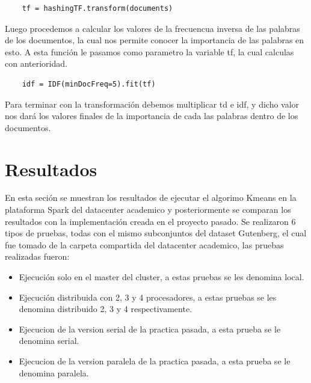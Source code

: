 \documentclass[conference,compsoc]{IEEEtran}
\begin{document}
\begin{lstlisting}
    tf = hashingTF.transform(documents)
\end{lstlisting}

\vspace{0.5cm}

Luego procedemos a calcular los valores de la frecuencua inversa de las
palabras de los documentos, la cual nos permite conocer la importancia de las
palabras en esto. A esta función le pasamos como parametro la variable tf, la
cual calculas con anterioridad.\\

\begin{lstlisting}
    idf = IDF(minDocFreq=5).fit(tf)
\end{lstlisting}

\vspace{0.5cm}

Para terminar con la transformación debemos multiplicar td e idf, y dicho valor
nos dará los valores finales de la importancia de cada las palabras dentro de
los documentos.

\section{Resultados}

En esta seción se muestran los resultados de ejecutar el algorimo Kmeans en la
plataforma Spark del datacenter academico y posteriormente se comparan los
resultados con la implementación creada en el proyecto pasado. Se realizaron 6 tipos
de pruebas, todas con el mismo subconjuntos del dataset Gutenberg, el cual fue
tomado de la carpeta compartida del datacenter academico, las pruebas realizadas
fueron:\\

\begin{itemize}
    \item Ejecución solo en el master del cluster, a estas pruebas se les denomina local.
    \item Ejecución distribuida con 2, 3 y 4 procesadores, a estas pruebas se les denomina
          distribuido 2, 3 y 4 respectivamente.
    \item Ejecucion de la version serial de la practica pasada, a esta prueba se le
          denomina serial.
    \item Ejecucion de la version paralela de la practica pasada, a esta prueba se le
          denomina paralela.
\end{itemize}
\end{document}
